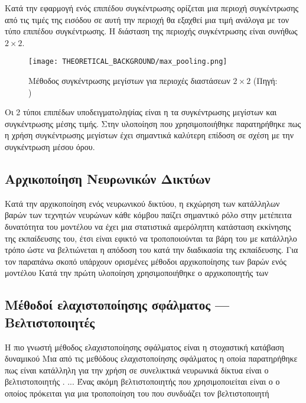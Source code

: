 Κατά την εφαρμογή ενός επιπέδου συγκέντρωσης ορίζεται μια περιοχή συγκέντρωσης από τις τιμές της εισόδου σε αυτή την περιοχή θα εξαχθεί μια τιμή ανάλογα με τον τύπο επιπέδου συγκέντρωσης. Η διάσταση της περιοχής συγκέντρωσης είναι συνήθως $2\times2$. 

\begin{figure}[H]
  \begin{center}
    \texttt{[image: THEORETICAL\_BACKGROUND/max\_pooling.png]}
    \caption{Μέθοδος συγκέντρωσης μεγίστων για περιοχές διαστάσεων $2\times2$ (Πηγή: \href{https://computersciencewiki.org/index.php/Max-pooling_/_Pooling}{})}
  \end{center}
\end{figure}

Οι 2 τύποι επιπέδων υποδειγματοληψίας είναι η τα συγκέντρωσης μεγίστων και συγκέντρωσης μέσης τιμής. Στην υλοποίηση που χρησιμοποιήθηκε παρατηρήθηκε πως η χρήση συγκέντρωσης μεγίστων έχει σημαντικά καλύτερη επίδοση σε σχέση με την συγκέντρωση μέσου όρου.

\subsection{Αρχικοποίηση Νευρωνικών Δικτύων}
Κατά την αρχικοποίηση ενός νευρωνικού δικτύου, η εκχώρηση των κατάλληλων βαρών των τεχνητών νευρώνων κάθε κόμβου παίζει σημαντικό ρόλο στην μετέπειτα δυνατότητα του μοντέλου να έχει μια στατιστικά αμερόληπτη κατάσταση εκκίνησης της εκπαίδευσης του, έτσι είναι εφικτό να τροποποιούνται τα βάρη του με κατάλληλο τρόπο ώστε να βελτιώνεται η απόδοση του κατά την διαδικασία της εκπαίδευσης.
Για τον παραπάνω σκοπό υπάρχουν ορισμένες μέθοδοι αρχικοποίησης των βαρών ενός μοντέλου
Κατά την πρώτη υλοποίηση χρησιμοποιήθηκε ο αρχικοποιητής των 

\subsection{Μέθοδοί ελαχιστοποίησης σφάλματος --- Βελτιστοποιητές }

Η πιο γνωστή μέθοδος ελαχιστοποίησης σφάλματος είναι η στοχαστική κατάβαση δυναμικού 
Μια από τις μεθόδους ελαχιστοποίησης σφάλματος η οποία παρατηρήθηκε πως είναι κατάλληλη για την χρήση σε συνελικτικά νευρωνικά δίκτυα είναι ο βελτιστοποιητής . ...
Ένας ακόμη βελτιστοποιητής που χρησιμοποιείται είναι ο  ο οποίος πρόκειται για μια τροποποίηση του  που συνδυάζει τον βελτιστοποιητή 


